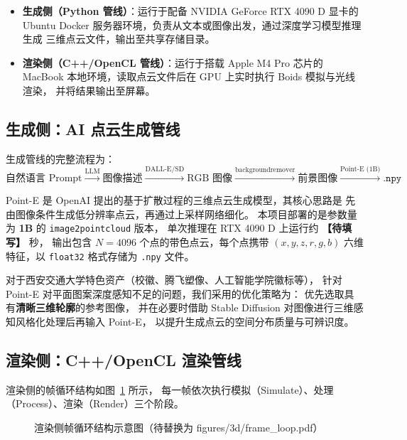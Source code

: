 \begin{itemize}
  \item \textbf{生成侧（Python 管线）}：运行于配备 NVIDIA GeForce RTX 4090 D 显卡的
        Ubuntu Docker 服务器环境，负责从文本或图像出发，通过深度学习模型推理生成
        三维点云文件，输出至共享存储目录。
  \item \textbf{渲染侧（C++/OpenCL 管线）}：运行于搭载 Apple M4 Pro 芯片的
        MacBook 本地环境，读取点云文件后在 GPU 上实时执行 Boids 模拟与光线渲染，
        并将结果输出至屏幕。
\end{itemize}

\subsection{生成侧：AI 点云生成管线}

生成管线的完整流程为：
\[
  \text{自然语言 Prompt}
  \xrightarrow{\text{LLM}} \text{图像描述}
  \xrightarrow{\text{DALL-E/SD}} \text{RGB 图像}
  \xrightarrow{\text{backgroundremover}} \text{前景图像}
  \xrightarrow{\text{Point-E (1B)}} \texttt{.npy}
\]

Point-E 是 OpenAI 提出的基于扩散过程的三维点云生成模型，其核心思路是
先由图像条件生成低分辨率点云，再通过上采样网络细化。
本项目部署的是参数量为 \textbf{1B} 的 \texttt{image2pointcloud} 版本，
单次推理在 RTX 4090 D 上运行约 \textbf{【待填写】} 秒，
输出包含 $N=4096$ 个点的带色点云，每个点携带
$(x, y, z, r, g, b)$ 六维特征，以 \texttt{float32} 格式存储为 \texttt{.npy} 文件。

对于西安交通大学特色资产（校徽、腾飞塑像、人工智能学院徽标等），
针对 Point-E 对平面图案深度感知不足的问题，我们采用的优化策略为：
优先选取具有\textbf{清晰三维轮廓}的参考图像，
并在必要时借助 Stable Diffusion 对图像进行三维感知风格化处理后再输入 Point-E，
以提升生成点云的空间分布质量与可辨识度。

\subsection{渲染侧：C++/OpenCL 渲染管线}

渲染侧的帧循环结构如图~\ref{fig:frame_loop} 所示，
每一帧依次执行模拟（Simulate）、处理（Process）、渲染（Render）三个阶段。

\begin{figure}[htbp]
  \centering
  \fbox{\rule{0pt}{5cm}\rule{12cm}{0pt}}
  \caption{渲染侧帧循环结构示意图（待替换为 figures/3d/frame\_loop.pdf）}
  \label{fig:frame_loop}
\end{figure}

